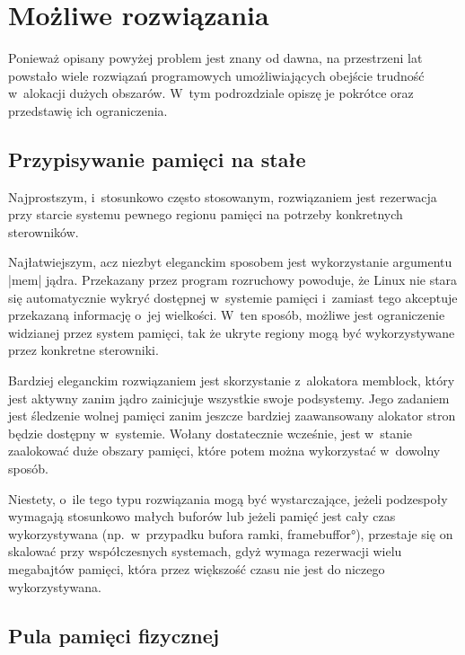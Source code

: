 \section{Możliwe rozwiązania}

Ponieważ opisany powyżej problem jest znany od dawna, na przestrzeni
lat powstało wiele rozwiązań programowych umożliwiających obejście
trudność w~alokacji dużych obszarów.  W~tym podrozdziale opiszę je
pokrótce oraz przedstawię ich ograniczenia.

\subsection{Przypisywanie pamięci na stałe}\label{sec:rezerwe-mem}

Najprostszym, i~stosunkowo często stosowanym, rozwiązaniem jest
rezerwacja przy starcie systemu pewnego regionu pamięci na potrzeby
konkretnych sterowników.

Najłatwiejszym, acz niezbyt eleganckim sposobem jest wykorzystanie
argumentu \code|mem| jądra.  Przekazany przez program rozruchowy
powoduje, że Linux nie stara się automatycznie wykryć dostępnej
w~systemie pamięci  i~zamiast tego akceptuje przekazaną
informację o~jej wielkości.  W~ten sposób, możliwe jest ograniczenie
widzianej przez system pamięci, tak że ukryte regiony mogą być
wykorzystywane przez konkretne sterowniki.

Bardziej eleganckim rozwiązaniem jest skorzystanie z~alokatora
memblock,  który jest aktywny zanim jądro
zainicjuje wszystkie swoje podsystemy.  Jego zadaniem jest śledzenie
wolnej pamięci zanim jeszcze bardziej zaawansowany alokator stron
będzie dostępny w~systemie.  Wołany dostatecznie wcześnie, jest
w~stanie zaalokować duże obszary pamięci, które potem można
wykorzystać w~dowolny sposób.

Niestety, o~ile tego typu rozwiązania mogą być wystarczające, jeżeli
podzespoły wymagają stosunkowo małych buforów lub jeżeli pamięć jest
cały czas wykorzystywana (np.\ w~przypadku bufora ramki,
\ang{framebuffor}), przestaje się on skalować przy współczesnych
systemach, gdyż wymaga rezerwacji wielu megabajtów pamięci, która
przez większość czasu nie jest do niczego wykorzystywana.

\subsection{Pula pamięci fizycznej}\label{sec:intro-pmm}

